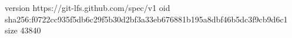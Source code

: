 version https://git-lfs.github.com/spec/v1
oid sha256:f0722cc935f5db6c29f5b30d2bf3a33eb676881b195a8dbf46b5dc3f9cb9d6c1
size 43840
